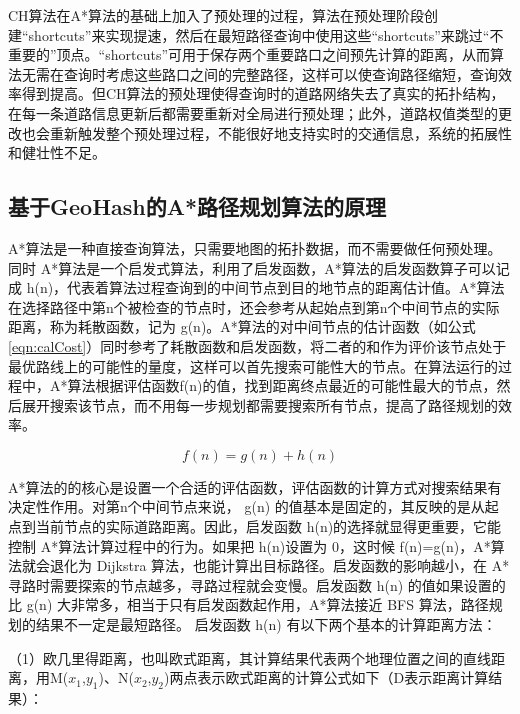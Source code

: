 CH算法在A*算法的基础上加入了预处理的过程，算法在预处理阶段创建“shortcuts”来实现提速，然后在最短路径查询中使用这些“shortcuts”来跳过“不重要的”顶点。“shortcuts”可用于保存两个重要路口之间预先计算的距离，从而算法无需在查询时考虑这些路口之间的完整路径，这样可以使查询路径缩短，查询效率得到提高。但CH算法的预处理使得查询时的道路网络失去了真实的拓扑结构，在每一条道路信息更新后都需要重新对全局进行预处理；此外，道路权值类型的更改也会重新触发整个预处理过程，不能很好地支持实时的交通信息，系统的拓展性和健壮性不足。\par

\subsection{基于GeoHash的A*路径规划算法的原理}
A*算法是一种直接查询算法，只需要地图的拓扑数据，而不需要做任何预处理。同时 A*算法是一个启发式算法，利用了启发函数，A*算法的启发函数算子可以记成 h(n)，代表着算法过程查询到的中间节点到目的地节点的距离估计值。A*算法在选择路径中第n个被检查的节点时，还会参考从起始点到第n个中间节点的实际距离，称为耗散函数，记为 g(n)。A*算法的对中间节点的估计函数（如公式\ref{eqn:calCost}）同时参考了耗散函数和启发函数，将二者的和作为评价该节点处于最优路线上的可能性的量度，这样可以首先搜索可能性大的节点。在算法运行的过程中，A*算法根据评估函数f(n)的值，找到距离终点最近的可能性最大的节点，然后展开搜索该节点，而不用每一步规划都需要搜索所有节点，提高了路径规划的效率。\par

\begin{equation}
  \label{eqn:calCost}
  f(n)=g(n)+h(n)
\end{equation}

A*算法的的核心是设置一个合适的评估函数，评估函数的计算方式对搜索结果有决定性作用。对第n个中间节点来说， g(n) 的值基本是固定的，其反映的是从起点到当前节点的实际道路距离。因此，启发函数 h(n)的选择就显得更重要，它能控制 A*算法计算过程中的行为。如果把 h(n)设置为 0，这时候 f(n)=g(n)，A*算法就会退化为 Dijkstra 算法，也能计算出目标路径。启发函数的影响越小，在 A*寻路时需要探索的节点越多，寻路过程就会变慢。启发函数 h(n) 的值如果设置的比 g(n) 大非常多，相当于只有启发函数起作用，A*算法接近 BFS 算法，路径规划的结果不一定是最短路径。
启发函数 h(n) 有以下两个基本的计算距离方法：\par

（1）欧几里得距离，也叫欧式距离，其计算结果代表两个地理位置之间的直线距离，用M($x_1$,$y_1$)、N($x_2$,$y_2$)两点表示欧式距离的计算公式如下（D表示距离计算结果）：\par

